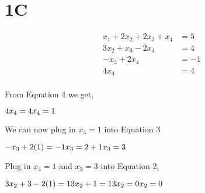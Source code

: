 \documentclass{article}
\begin{document}

\section*{1C}   

\setcounter{equation}{0} %
    
    \begin{align} 
        x_1 + 2x_2 + 2x_3 + x_4 & = 5 \\ %
        3x_2 + x_3 - 2x_4 & = 4 \\ %
        -x_3 + 2x_4 & = -1 \\ %
        4x_4 & = 4 \\ %
    \end{align}

\raggedright From Equation 4 we get, \newline

    \begin{math}
         4x_4 = 4 
         \newline %
         x_4 = 1 
         \newline
    \end{math} \newline

\raggedright We can now plug in  \begin{math} x_4 = 1 \end{math} into Equation 3 \newline

    \begin{math}
         -x_3 + 2(1) = -1  
         \newline 
         x_3 = 2 + 1
         \newline
         x_3 = 3
    \end{math} \newline

\raggedright Plug in \begin{math} x_4 = 1 \end{math} and \begin{math} x_3 = 3 \end{math}  into Equation 2, \newline
    
    \begin{math}
        3x_2 + 3 - 2(1) = 1 \newline
        3x_2 + 1  = 1 \newline
        3x_2 = 0 \newline
        x_2 = 0 \newline  
    \end{math}
\end{document}

